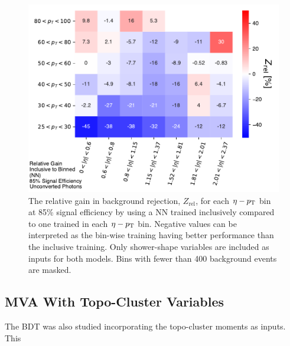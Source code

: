 \begin{figure}
    \centering
    \includegraphics[width=.85\textwidth]{chapters/chapter4_photonID/images/NNinclusive_v_NN_normed.pdf}
    \caption[The relative gain in background rejection by using a \gls{NN} trained inclusively compared to one trained bin-wise]
    {The relative gain in background rejection, $Z_{\text{rel}}$, for each $\eta-p_{\text{T}}$ bin at 85\% signal efficiency by using a \gls{NN} trained inclusively compared to one trained in each $\eta-p_{\text{T}}$ bin. Negative values can be interpreted as the bin-wise training having better performance than the inclusive training. Only shower-shape variables are included as inputs for both models. Bins with fewer than 400 background events are masked.}
    \label{fig:nninclusive-v-binned}
\end{figure}



\subsection{MVA With Topo-Cluster Variables}

The \gls{BDT} was also studied incorporating the topo-cluster moments as inputs. This 